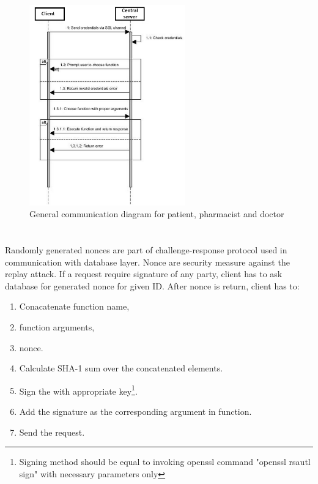 \begin{figure}[h]
\centering
\includegraphics[width=0.6\textwidth]{database/sequence.png}
\caption{General communication diagram for patient, pharmacist and doctor}
\end{figure} 

\section{}

Randomly generated nonces are part of challenge-response protocol used in communication with database layer. Nonce are security measure against the replay attack. If a request require signature of any party, client has to ask database for generated nonce for given ID. After nonce is return, client has to:
\begin{enumerate}
 \item Conacatenate function name,
 \item function arguments,
 \item nonce.
 \item Calculate SHA-1 sum over the concatenated elements.
 \item Sign the with appropriate key\footnote{Signing method should be equal to invoking openssl command "openssl rsautl sign" with necessary parameters only}.
 \item Add the signature as the corresponding argument in function.
 \item Send the request.
\end{enumerate}

